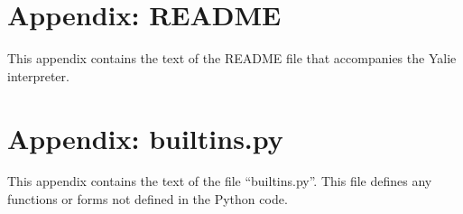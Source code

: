 \documentclass[twocolumn]{article}
\begin{document}
\section*{Appendix: README}
This appendix contains the text of the README file that accompanies
the Yalie interpreter.


\section*{Appendix: builtins.py}
This appendix contains the text of the file ``builtins.py''. This file
defines any functions or forms not defined in the Python code.

\end{document}
